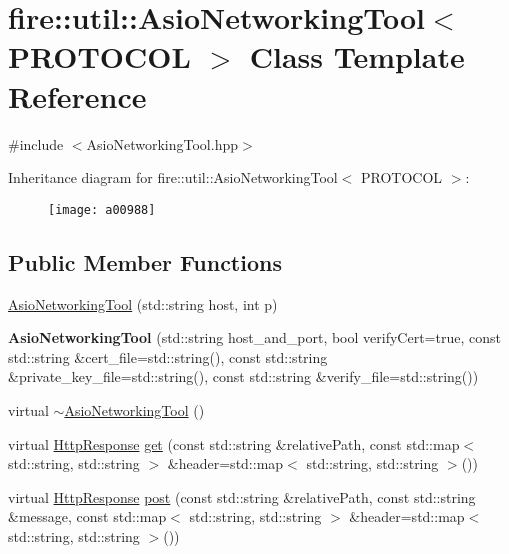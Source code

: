\hypertarget{a00988}{}\section{fire\+:\+:util\+:\+:Asio\+Networking\+Tool$<$ P\+R\+O\+T\+O\+C\+OL $>$ Class Template Reference}
\label{a00988}


{\ttfamily \#include $<$Asio\+Networking\+Tool.\+hpp$>$}

Inheritance diagram for fire\+:\+:util\+:\+:Asio\+Networking\+Tool$<$ P\+R\+O\+T\+O\+C\+OL $>$\+:\begin{figure}[H]
\begin{center}
\leavevmode
\texttt{[image: a00988]}
\end{center}
\end{figure}
\subsection*{Public Member Functions}
\begin{DoxyCompactItemize}
\item 
\hyperlink{a00988_a5edd72ce9937e052a82e7564500b3861}{Asio\+Networking\+Tool} (std\+::string host, int p)
\item 
\mbox{\label{a00988_a5826de4a9e051ec854ad7be3a48ac86d}} 
{\bfseries Asio\+Networking\+Tool} (std\+::string host\+\_\+and\+\_\+port, bool verify\+Cert=true, const std\+::string \&cert\+\_\+file=std\+::string(), const std\+::string \&private\+\_\+key\+\_\+file=std\+::string(), const std\+::string \&verify\+\_\+file=std\+::string())
\item 
virtual \hyperlink{a00988_afc51c728e1bd136b6729ac892df490ab}{$\sim$\+Asio\+Networking\+Tool} ()
\item 
virtual \hyperlink{a00992}{Http\+Response} \hyperlink{a00988_a42609f768f245acf0867889e920c5d49}{get} (const std\+::string \&relative\+Path, const std\+::map$<$ std\+::string, std\+::string $>$ \&header=std\+::map$<$ std\+::string, std\+::string $>$())
\item 
virtual \hyperlink{a00992}{Http\+Response} \hyperlink{a00988_a2ac524ceef89fceb928cf74420bf90a5}{post} (const std\+::string \&relative\+Path, const std\+::string \&message, const std\+::map$<$ std\+::string, std\+::string $>$ \&header=std\+::map$<$ std\+::string, std\+::string $>$())
\end{DoxyCompactItemize}
